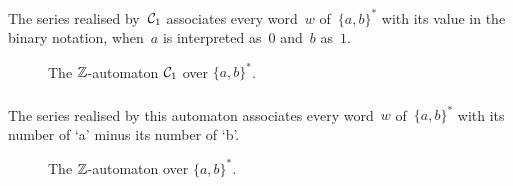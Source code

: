 \Comt
The series realised by~$\mathcal{C}_1$ associates every word~$w$
of~$\{a,b\}^{*}$ with its value in the binary notation, when~$a$ is
interpreted as~$0$ and~$b$ as~$1$.

\begin{figure}[ht]
    \centering
    \caption{The $\mathbb{Z}$-automaton $\mathcal{C}_1$ over
    $\{a,b\}^{*}$. }
\label{fig:c1-app}
\end{figure}

\subsubsection{}

\Comt
The series realised by this automaton associates every word~$w$
of~$\{a,b\}^{*}$ with its number of `a' minus its number of `b'.

\begin{figure}[ht]
    \centering
    \caption{The $\mathbb{Z}$-automaton  over
    $\{a,b\}^{*}$. }
\label{fig:d1-app}
\end{figure}








